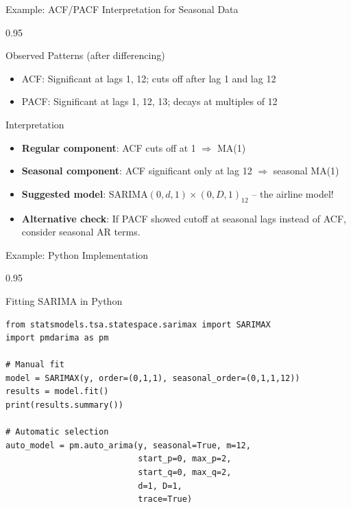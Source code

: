 \documentclass[9pt, aspectratio=169, t]{beamer}
\begin{document}
\begin{frame}{Example: ACF/PACF Interpretation for Seasonal Data}
    \begin{cminipage}{0.95\textwidth}
    \begin{alertblock}{Observed Patterns (after differencing)}
        \begin{itemize}\setlength{\itemsep}{0pt}
            \item ACF: Significant at lags 1, 12; cuts off after lag 1 and lag 12
            \item PACF: Significant at lags 1, 12, 13; decays at multiples of 12
        \end{itemize}
    \end{alertblock}

    \vspace{0.2cm}

    \begin{exampleblock}{Interpretation}
        \begin{itemize}\setlength{\itemsep}{0pt}
            \item \textbf{Regular component}: ACF cuts off at 1 $\Rightarrow$ MA(1)
            \item \textbf{Seasonal component}: ACF significant only at lag 12 $\Rightarrow$ seasonal MA(1)
            \item \textbf{Suggested model}: SARIMA$(0,d,1) \times (0,D,1)_{12}$ -- the airline model!
            \item \textbf{Alternative check}: If PACF showed cutoff at seasonal lags instead of ACF, consider seasonal AR terms.
        \end{itemize}
    \end{exampleblock}
    \end{cminipage}
\end{frame}

\begin{frame}[fragile]{Example: Python Implementation}
    \begin{cminipage}{0.95\textwidth}
    \begin{block}{Fitting SARIMA in Python}
        \small
        \begin{verbatim}
from statsmodels.tsa.statespace.sarimax import SARIMAX
import pmdarima as pm

# Manual fit
model = SARIMAX(y, order=(0,1,1), seasonal_order=(0,1,1,12))
results = model.fit()
print(results.summary())

# Automatic selection
auto_model = pm.auto_arima(y, seasonal=True, m=12,
                           start_p=0, max_p=2,
                           start_q=0, max_q=2,
                           d=1, D=1,
                           trace=True)
        \end{verbatim}
    \end{block}
    \end{cminipage}
\end{frame}
\end{document}
